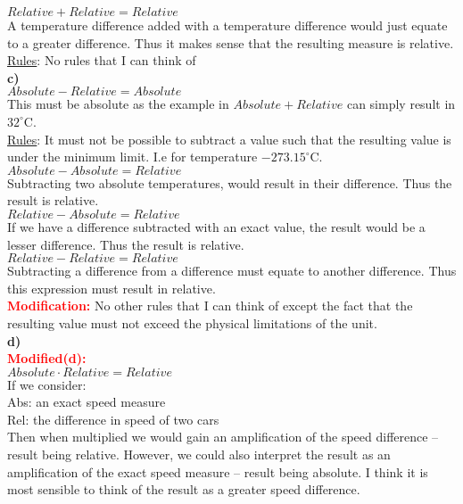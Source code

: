 $Relative + Relative = Relative$\\
A temperature difference added with a temperature difference would just equate to a greater difference. Thus it makes sense that the resulting measure is relative.\\
\underline{Rules}: No rules that I can think of\\

\textbf{c)}\\
$Absolute - Relative = Absolute$\\
This must be absolute as the example in $Absolute + Relative$ can simply result in $32^\circ$C.\\
\underline{Rules}: It must not be possible to subtract a value such that the resulting value is under the minimum limit. I.e for temperature $-273.15^\circ$C.\\

$Absolute - Absolute = Relative$\\
Subtracting two absolute temperatures, would result in their difference. Thus the result is relative.\\

$Relative - Absolute = Relative$\\
If we have a difference subtracted with an exact value, the result would be a lesser difference. Thus the result is relative.\\

$Relative - Relative = Relative$\\
Subtracting a difference from a difference must equate to another difference. Thus this expression must result in relative.\\

\textcolor{red}{\textbf{Modification:}} No other rules that I can think of except the fact that the resulting value must not exceed the physical limitations of the unit.\\
	
\textbf{d)}\\
\textcolor{red}{\textbf{Modified(d):}}\\
$Absolute \cdot Relative = Relative$\\
If we consider:\\
Abs: an exact speed measure\\
Rel: the difference in speed of two cars\\
Then when multiplied we would gain an amplification of the speed difference -- result being relative. However, we could also interpret the result as an amplification of the exact speed measure -- result being absolute. I think it is most sensible to think of the result as a greater speed difference. \\


